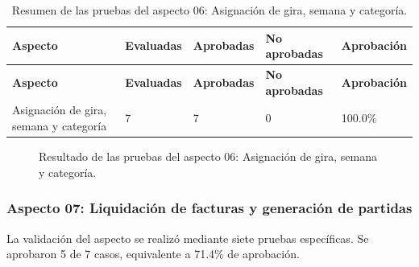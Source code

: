 \endgroup
\begingroup\fontsize{8}{9}\selectfont\setlength{\tabcolsep}{4pt}
\begin{xltabular}{\linewidth}{@{}p{4.0cm}p{2.0cm}p{2.0cm}p{2.2cm}p{2.2cm}@{}}

\caption{Resumen de las pruebas del aspecto 06: Asignación de gira, semana y categoría.}\label{tab:cap4_resumen_aspecto_06}\\
\toprule
\textbf{Aspecto} & \textbf{Evaluadas} & \textbf{Aprobadas} & \textbf{No aprobadas} & \textbf{Aprobación}\\
\midrule
\endfirsthead
\toprule
\textbf{Aspecto} & \textbf{Evaluadas} & \textbf{Aprobadas} & \textbf{No aprobadas} & \textbf{Aprobación}\\
\midrule
\endhead
\endfoot
\bottomrule
\endlastfoot

Asignación de gira, semana y categoría & 7 & 7 & 0 & 100.0\%\\
\bottomrule
\end{xltabular}
\endgroup


\begin{figure}[H]
\centering
\caption{Resultado de las pruebas del aspecto 06: Asignación de gira, semana y categoría.}\label{fig:cap4_aspecto_via_06}
\end{figure}

\subsubsection{Aspecto 07: Liquidación de facturas y generación de partidas}
La validación del aspecto se realizó mediante siete pruebas específicas. Se aprobaron 5 de 7 casos, equivalente a 71.4\% de aprobación.


